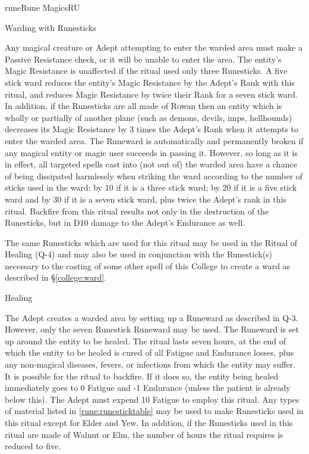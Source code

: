 \begin{college}[1.1]{rune}{Rune Magics}{RU}
\begin{ritual}[Q-3]{Warding with Runesticks}
\begin{effects}
Any magical creature or Adept attempting to enter the warded area must
make a Passive Resistance check, or it will be unable to enter the
area.  The entity's Magic Resistance is unaffected if the ritual used
only three Runesticks.  A five stick ward reduces the entity's Magic
Resistance by the Adept's Rank with this ritual, and reduces Magic
Resistance by twice their Rank for a seven stick ward. In addition, if
the Runesticks are all made of Rowan then an entity which is wholly or
partially of another plane (such as demons, devils, imps, hellhounds)
decreases its Magic Resistance by 3 times the Adept's Rank when it
attempts to enter the warded area. The Runeward is automatically and
permanently broken if any magical entity or magic user succeeds in
passing it. However, so long as it is in effect, all targeted spells
cast into (not out of) the warded area have a chance of being
dissipated harmlessly when striking the ward according to the number
of sticks used in the ward: by 10 if it is a three stick ward; by 20
if it is a five stick ward and by 30 if it is a seven stick ward, plus
twice the Adept's rank in this ritual.  Backfire from this ritual
results not only in the destruction of the Runesticks, but in D10
damage to the Adept's Endurance as well.

The same Runesticks which are used for this ritual may be used in the
Ritual of Healing (Q-4) and may also be used in conjunction with the
Runestick(s) necessary to the casting of some other spell of this
College to create a ward as described in \S\ref{college:ward}.
\end{effects}
\end{ritual}

\begin{ritual}[Q-4]{Healing}
\begin{effects}
The Adept creates a warded area by setting up a Runeward as described
in Q-3. However, only the seven Runestick Runeward may be used. The
Runeward is set up around the entity to be healed.  The ritual lasts
seven hours, at the end of which the entity to be healed is cured of
all Fatigue and Endurance losses, plus any non-magical diseases,
fevers, or infections from which the entity may suffer.  It is
possible for the ritual to backfire.  If it does so, the entity being
healed immediately goes to 0 Fatigue and -1 Endurance (unless the
patient is already below this).  The Adept must expend 10 Fatigue to
employ this ritual. Any types of material listed in
\ref{rune:runesticktable} may be used to make Runesticks used in this
ritual except for Elder and Yew.  In addition, if the Runesticks used
in this ritual are made of Walnut or Elm, the number of hours the
ritual requires is reduced to five.


\end{effects}
\end{ritual}
\end{college}
